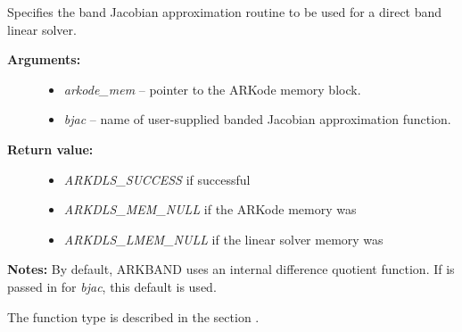 \documentclass[letterpaper,10pt,english]{sphinxmanual}
\begin{document}
\begin{fulllineitems}
\label{c_interface/User_callable:c.ARKDlsSetBandJacFn}
Specifies the band Jacobian approximation routine to be
used for a direct band linear solver.
\begin{description}
\item[{\textbf{Arguments:}}] \leavevmode\begin{itemize}
\item {} 
\emph{arkode\_mem} -- pointer to the ARKode memory block.

\item {} 
\emph{bjac} -- name of user-supplied banded Jacobian approximation function.

\end{itemize}

\item[{\textbf{Return value:}}] \leavevmode\begin{itemize}
\item {} 
\emph{ARKDLS\_SUCCESS}  if successful

\item {} 
\emph{ARKDLS\_MEM\_NULL}  if the ARKode memory was 

\item {} 
\emph{ARKDLS\_LMEM\_NULL} if the linear solver memory was 

\end{itemize}

\end{description}

\textbf{Notes:} By default, ARKBAND uses an internal difference quotient
function.  If  is passed in for \emph{bjac}, this default is used.

The function type {\hyperref[c_interface/User_supplied:c.ARKDlsBandJacFn]{\emph{}}} is described in the section
{\hyperref[c_interface/User_supplied:cinterface-usersupplied]{\emph{}}}.

\end{fulllineitems}

\end{document}
